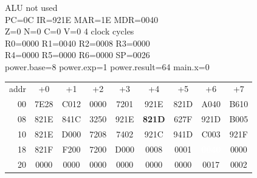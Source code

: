 \begin{tcolorbox}[stepbox, title={Step 27 \hfill PC 0B \quad ST R1, power.result}]
\textcolor{dim}{ALU} \textcolor{dim}{not used}\\
PC=0C IR=921E MAR=1E MDR=0040\\
Z=0 N=0 C=0 V=0 \hfill \textcolor{dim}{4 clock cycles}\\
R0=0000 R1=0040 R2=0008 R3=0000\\
R4=0000 R5=0000 R6=0000 SP=0026\\
\textcolor{dim}{power.base=8  power.exp=1  power.result=64  main.x=0}\\[1pt]
{\setlength{\tabcolsep}{1.6pt}\begin{tabular}{@{}r*{8}{c}@{}}
\textcolor{dim}{addr} & \textcolor{dim}{+0} & \textcolor{dim}{+1} & \textcolor{dim}{+2} & \textcolor{dim}{+3} & \textcolor{dim}{+4} & \textcolor{dim}{+5} & \textcolor{dim}{+6} & \textcolor{dim}{+7}\\
\textcolor{dim}{00} & 7E28 & C012 & 0000 & 7201 & 921E & 821D & A040 & B610\\
\textcolor{dim}{08} & 821E & 841C & 3250 & 921E & \cellcolor{pcc}\textbf{821D} & 627F & 921D & B005\\
\textcolor{dim}{10} & 821E & D000 & 7208 & 7402 & 921C & 941D & C003 & 921F\\
\textcolor{dim}{18} & 821F & F200 & 7200 & D000 & \cellcolor{datac}0008 & \cellcolor{datac}0001 & \cellcolor{wrt}\textcolor{white}{\textbf{0040}} & \cellcolor{datac}0000\\
\textcolor{dim}{20} & \cellcolor{stackc}0000 & \cellcolor{stackc}0000 & \cellcolor{stackc}0000 & \cellcolor{stackc}0000 & \cellcolor{stackc}0000 & \cellcolor{stackc}0000 & \cellcolor{stackc}0017 & \cellcolor{stackc}0002\\
\end{tabular}}
\end{tcolorbox}\par\vspace{3pt}
